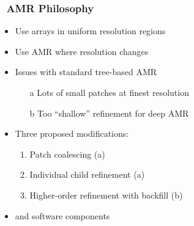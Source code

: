 \begin{frame}[fragile] \frametitle{\cello\ AMR Philosophy}
\begin{itemize}
\item Use arrays in uniform resolution regions
\item Use AMR where resolution changes
\item Issues with standard tree-based AMR
\begin{itemize}
\item[a] Lots of small patches at finest resolution
\item[b] Too ``shallow'' refinement for deep AMR
\end{itemize}
\item Three proposed modifications:
\begin{enumerate}
\item Patch coalescing (a)
\item Individual child refinement (a)
\item Higher-order refinement with backfill (b)
\end{enumerate}
\item {} and  software components
\end{itemize}
\end{frame}


